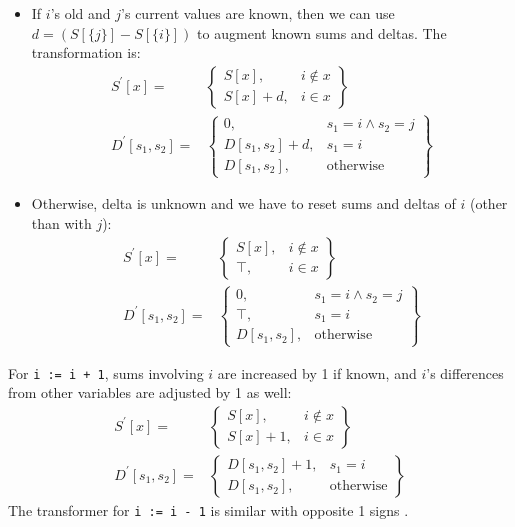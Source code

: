 \begin{itemize}
\item If $i$'s old  and $j$'s current values are known, then we can use $d = (S[\{j\}] - S[\{i\}])$ to augment known sums and deltas. The transformation is:
\begin{align*}
S^\prime[x] = & \left.
	\begin{cases}
		S[x], & i \notin x \\
		S[x] + d, & i \in x
	\end{cases}
\right\}\\
D^\prime[s_1, s_2] = & \left.
	\begin{cases}
		0, & s_1 = i \wedge s_2 = j \\
		D[s_1,s_2] + d, & s_1 = i \\
		D[s_1,s_2], & \text{otherwise}
	\end{cases}
\right\}
\end{align*}
\item Otherwise, delta is unknown and we have to reset sums and deltas of $i$ (other than with $j$):
\begin{align*}
S^\prime[x] = & \left.
	\begin{cases}
		S[x], & i \notin x \\
		\top, & i \in x
	\end{cases}
\right\}\\
D^\prime[s_1, s_2] = & \left.
	\begin{cases}
		0, & s_1 = i \wedge s_2 = j \\
		\top, & s_1 = i \\
		D[s_1,s_2], & \text{otherwise}
	\end{cases}
\right\}
\end{align*}
\end{itemize}

For \texttt{i := i + 1}, sums involving $i$ are increased by 1 if known, and $i$'s differences from other variables are adjusted by 1 as well:
\begin{align*}
S^\prime[x] = & \left.
	\begin{cases}
		S[x], & i \notin x \\
		S[x] + 1, & i \in x
	\end{cases}
\right\}\\
D^\prime[s_1, s_2] = & \left.
	\begin{cases}
		D[s_1,s_2] + 1, & s_1 = i \\
		D[s_1,s_2], & \text{otherwise}
	\end{cases}
\right\}
\end{align*}
The transformer for \texttt{i := i - 1} is similar with opposite 1 signs .


